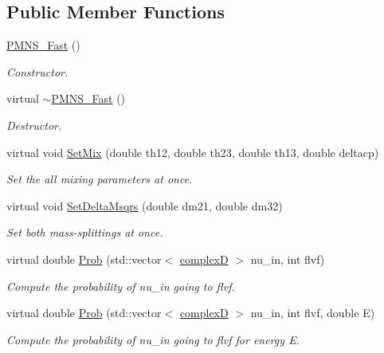 \subsection*{Public Member Functions}
\begin{DoxyCompactItemize}
\item 
\hyperlink{classOscProb_1_1PMNS__Fast_a2bbac744bf63753105d766a860af7c0d}{P\+M\+N\+S\+\_\+\+Fast} ()
\begin{DoxyCompactList}\small\item\em Constructor. \end{DoxyCompactList}\item 
virtual \hyperlink{classOscProb_1_1PMNS__Fast_ae1b797dda260ff83793cdfe448f58878}{$\sim$\+P\+M\+N\+S\+\_\+\+Fast} ()
\begin{DoxyCompactList}\small\item\em Destructor. \end{DoxyCompactList}\item 
virtual void \hyperlink{classOscProb_1_1PMNS__Fast_ad849b2231d99c5d66fb3ade8efb896e1}{Set\+Mix} (double th12, double th23, double th13, double deltacp)
\begin{DoxyCompactList}\small\item\em Set the all mixing parameters at once. \end{DoxyCompactList}\item 
virtual void \hyperlink{classOscProb_1_1PMNS__Fast_a63733b246e6d2e609ce3de7a65ba5b9f}{Set\+Delta\+Msqrs} (double dm21, double dm32)
\begin{DoxyCompactList}\small\item\em Set both mass-\/splittings at once. \end{DoxyCompactList}\item 
virtual double \hyperlink{classOscProb_1_1PMNS__Base_aa2e10704d2d205a1ec8988de14b1a66f}{Prob} (std\+::vector$<$ \hyperlink{EigenPoint_8h_a67ca8e107e20610c3fff78d5e726ece0}{complexD} $>$ nu\+\_\+in, int flvf)
\begin{DoxyCompactList}\small\item\em Compute the probability of nu\+\_\+in going to flvf. \end{DoxyCompactList}\item 
virtual double \hyperlink{classOscProb_1_1PMNS__Base_a0190a79284289aacf682c78d7cef9a81}{Prob} (std\+::vector$<$ \hyperlink{EigenPoint_8h_a67ca8e107e20610c3fff78d5e726ece0}{complexD} $>$ nu\+\_\+in, int flvf, double E)
\begin{DoxyCompactList}\small\item\em Compute the probability of nu\+\_\+in going to flvf for energy E. \end{DoxyCompactList}\item 

\end{DoxyCompactItemize}
